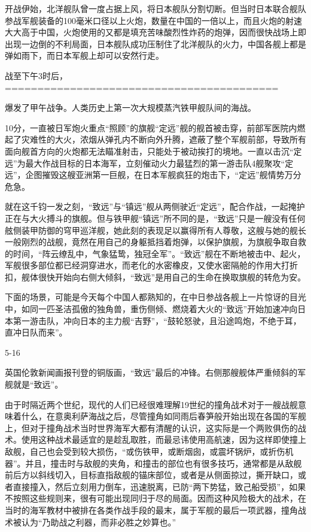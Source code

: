 \documentclass[12pt,UTF8]{ctexbook}
\begin{document}
开战伊始，北洋舰队曾一度占据上风，将日本舰队分割切断。但当时日本联合舰队参战军舰装备的100毫米口径以上火炮，数量在中国的一倍以上，而且火炮的射速大大高于中国，火炮使用的又都是填充苦味酸烈性炸药的炮弹，因而很快战场上即出现一边倒的不利局面，日本舰队成功压制住了北洋舰队的火力，中国各舰上都是弹如雨下，而日本军舰上却可以安然行走。

战至下午3时后，
==========================================



爆发了甲午战争。人类历史上第一次大规模蒸汽铁甲舰队间的海战。



10分，一直被日军炮火重点“照顾”的旗舰“定远”舰的舰首被击穿，前部军医院内燃起了灾难性的大火，浓烟从弹孔内不断向外升腾，遮蔽了整个军舰前部，导致所有面向舰首方向的火炮都无法瞄准射击，只能处于被动挨打的境地。一直以击沉“定远”为最大作战目标的日本海军，立刻催动火力最猛烈的第一游击队4舰聚攻“定远”，企图摧毁这艘亚洲第一巨舰，在日本军舰疯狂的炮击下，“定远”舰情势万分危急。

就在这千钧一发之刻，“致远”与“镇远”舰从两侧驶近“定远”，配合作战，一起掩护正在与大火搏斗的旗舰。但与铁甲舰“镇远”所不同的是，“致远”只是一艘没有任何舷侧装甲防御的穹甲巡洋舰，她此刻的表现足以赢得所有人尊敬，这艘与她的舰长一般刚烈的战舰，竟然在用自己的身躯抵挡着炮弹，以保护旗舰，为旗舰争取自救的时间，“阵云缭乱中，气象猛鸷，独冠全军”。“致远”舰在不断地被击中、起火，军舰很多部位都已经洞穿进水，而老化的水密橡皮，又使水密隔舱的作用大打折扣，舰体很快开始向右侧大倾斜，“致远”是用自己的生命在换取旗舰的转危为安。

下面的场景，可能是今天每个中国人都熟知的，在中日参战各舰上一片惊讶的目光中，如同一匹圣洁孤傲的独角兽，重伤侧倾、燃烧着大火的“致远”开始加速冲向日本第一游击队，冲向日本的主力舰“吉野”，“鼓轮怒驶，且沿途鸣炮，不绝于耳，直冲日队而来”。

5-16

英国伦敦新闻画报刊登的铜版画，“致远”最后的冲锋。右侧那艘舰体严重倾斜的军舰就是“致远”。

由于时隔近两个世纪，现代的人们已经很难理解19世纪的撞角战术对于一艘战舰意味着什么，在意奥利萨海战之后，尽管撞角如同雨后春笋般开始出现在各国的军舰上，但对于撞角战术当时世界海军大都有清醒的认识，这实际是一个两败俱伤的战术。使用这种战术最适宜的是趁乱取胜，而最忌讳使用高航速，因为这样即使撞上敌舰，自己也会受到较大损伤，“或伤铁甲，或断烟囱，或震坏锅炉，或折伤机器”。并且，撞击时与敌舰的夹角，和撞击的部位也有很多技巧，通常都是从敌舰前后方以斜线切入，目标直指敌舰的锚床部位，或者是从侧面掠过，撕开缺口，或者直接撞入，然后立刻用力倒车，迅速脱离，已防“两下势猛，致己船受损”，如果不按照这些规则来，很有可能出现同归于尽的局面。因而这种风险极大的战术，在当时的海军教材中被排在各类作战手段的最末，属于军舰的最后一项武器，撞角战术被认为“乃助战之利器，而非必胜之妙算也。”
\end{document}
